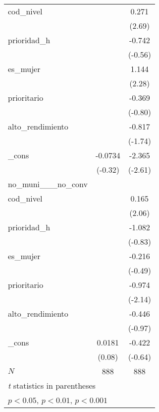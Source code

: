 {\begin{tabular}{l*{2}{c}}
cod\_nivel   &                     &       0.271\sym{**} \\
            &                     &      (2.69)         \\
[1em]
prioridad\_h &                     &      -0.742         \\
            &                     &     (-0.56)         \\
[1em]
es\_mujer    &                     &       1.144\sym{*}  \\
            &                     &      (2.28)         \\
[1em]
prioritario &                     &      -0.369         \\
            &                     &     (-0.80)         \\
[1em]
alto\_rendimiento&                     &      -0.817         \\
            &                     &     (-1.74)         \\
[1em]
\_cons      &     -0.0734         &      -2.365\sym{**} \\
            &     (-0.32)         &     (-2.61)         \\
\hline
no\_muni\_\_\_no\_conv&                     &                     \\
cod\_nivel   &                     &       0.165\sym{*}  \\
            &                     &      (2.06)         \\
[1em]
prioridad\_h &                     &      -1.082         \\
            &                     &     (-0.83)         \\
[1em]
es\_mujer    &                     &      -0.216         \\
            &                     &     (-0.49)         \\
[1em]
prioritario &                     &      -0.974\sym{*}  \\
            &                     &     (-2.14)         \\
[1em]
alto\_rendimiento&                     &      -0.446         \\
            &                     &     (-0.97)         \\
[1em]
\_cons      &      0.0181         &      -0.422         \\
            &      (0.08)         &     (-0.64)         \\
\hline
\(N\)       &         888         &         888         \\
\hline\hline
\multicolumn{3}{l}{\footnotesize \textit{t} statistics in parentheses}\\
\multicolumn{3}{l}{\footnotesize \sym{*} \(p<0.05\), \sym{**} \(p<0.01\), \sym{***} \(p<0.001\)}\\
\end{tabular}
}
